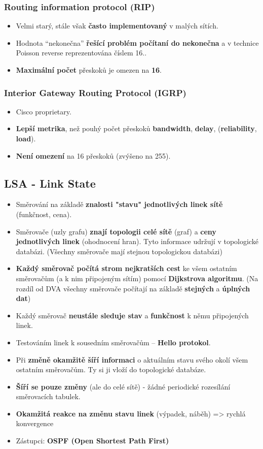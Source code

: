 \subsubsection*{Routing information protocol (RIP)}
\begin{itemize}
	\item Velmi starý, stále však \textbf{často implementovaný} v malých sítích.
	\item Hodnota “nekonečna” \textbf{řešící problém počítaní do nekonečna} a v technice Poisson reverse reprezentována číslem 16..
	\item \textbf{Maximální počet} přeskoků je omezen na \textbf{16}.
\end{itemize}

\subsubsection*{Interior Gateway Routing Protocol (IGRP)}
\begin{itemize}
\item Cisco proprietary.
\item \textbf{Lepší metrika}, než pouhý počet přeskoků \textbf{bandwidth}, \textbf{delay}, (\textbf{reliability}, \textbf{load}).
\item \textbf{Není omezení }na 16 přeskoků (zvýšeno na 255).
\end{itemize}

\subsection*{LSA - Link State}
\begin{itemize}
\item Směrování na základě \textbf{znalosti "stavu" jednotlivých linek sítě} (funkčnost, cena).
\item Směrovače (uzly grafu) \textbf{znají topologii celé sítě }(graf) a \textbf{ceny jednotlivých linek} (ohodnocení hran). Tyto informace udržují v topologické databázi. (Všechny směrovače mají stejnou topologickou databázi)
\item \textbf{Každý směrovač počítá strom nejkratších cest} ke všem ostatním směrovačům (a k nim připojeným sítím) pomocí \textbf{Dijkstrova algoritmu}. (Na rozdíl od DVA všechny směrovače počítají na základě \textbf{stejných} a\textbf{ úplných dat})
\item Každý směrovač\textbf{ neustále sleduje stav} a \textbf{funkčnost} k němu připojených linek.
\item Testováním linek k sousedním směrovačům – \textbf{Hello protokol}.
\item Při \textbf{změně okamžitě šíří informaci} o aktuálním stavu svého okolí všem ostatním směrovačům. Ty si ji vloží do topologické databáze.
\item \textbf{Šíří se pouze změny} (ale do celé sítě) - žádné periodické rozesílání směrovacích tabulek.
\item \textbf{Okamžitá reakce na změnu stavu linek} (výpadek, náběh) => rychlá konvergence
\item Zástupci: \textbf{OSPF (Open Shortest Path First)}
\end{itemize}


